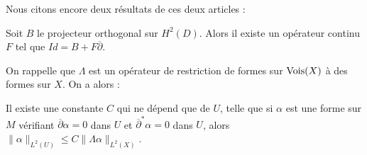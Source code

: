 Nous citons encore deux résultats de ces deux articles :
\begin{prop}
Soit $B$ le projecteur orthogonal sur $H^2(D)$. Alors il existe un opérateur continu $F$ tel que $Id = B + F\overline{\partial}$.
\end{prop}
On rappelle que $\Lambda$ est un opérateur de restriction de formes sur $\operatorname{Vois}(X)$ à des formes sur $X$. On a alors :
\begin{prop}
Il existe une constante $C$ qui ne dépend que de $U$, telle que si $\alpha$ est une forme sur $M$ vérifiant $\overline{\partial}\alpha=0$ dans $U$ et $\overline{\partial}^{*}\alpha=0$ dans $U$, alors $\|\alpha\|_{L^2(U)} \leq C\|\Lambda\alpha\|_{L^2(X)}$.
\end{prop}
